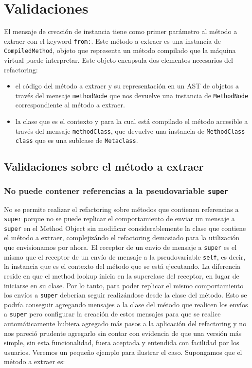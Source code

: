 \section{Validaciones}
El mensaje de creación de instancia tiene como primer parámetro al método a
extraer con el keyword \lstinline{from:}. Este método a extraer es una instancia
de \lstinline{CompiledMethod}, objeto que representa un método compilado que la
máquina virtual puede interpretar. Este objeto encapsula dos elementos
necesarios del refactoring:

\begin{itemize}
    \item el código del método a extraer y su representación en un AST de
      objetos a través del mensaje \lstinline{methodNode} que nos devuelve una
      instancia de \lstinline{MethodNode} correspondiente al método a extraer.
    \item la clase que es el contexto y para la cual está compilado el método
      accesible a través del mensaje \lstinline{methodClass}, que devuelve una
      instancia de \lstinline{MethodClass class} que es una sublcase de
      \lstinline{Metaclass}.
\end{itemize}

\subsection*{Validaciones sobre el método a extraer}

\subsubsection*{No puede contener referencias a la pseudovariable \lstinline{super}}

No se permite realizar el refactoring sobre métodos que contienen referencias a
\lstinline{super} porque no se puede replicar el comportamiento de enviar un
mensaje a \lstinline{super} en el Method Object sin modificar considerablemente
la clase que contiene el método a extraer, complejizándo el refactoring
demasiado para la utilización que envisionamos por ahora. El receptor de un
envío de mensaje a \lstinline{super} es el mismo que el receptor de un envío de
mensaje a la pseudovariable \lstinline{self}, es decir, la instancia que es el
contexto del método que se está ejecutando. La diferencia reside en que el
method lookup inicia en la superclase del receptor, en lugar de iniciarse en su
clase. Por lo tanto, para poder replicar el mismo comportamiento los envíos a
\lstinline{super} deberían seguir realizándose desde la clase del método. Esto
se podría conseguir agregando mensajes a la clase del método que realicen los
envíos a \lstinline{super} pero configurar la creación de estos mensajes para
que se realice automáticamente hubiera agregado más pasos a la aplicación del
refactoring y no nos pareció prudente agregarlo sin contar con evidencia de que
una versión más simple, sin esta funcionalidad, fuera aceptada y entendida con
facilidad por los usuarios. Veremos un pequeño ejemplo para ilustrar el
caso. Supongamos que el método a extraer es:

